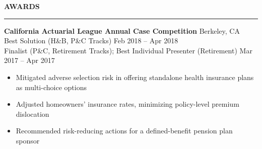\documentclass[11pt,letterpaper]{article}
\newcommand{\sectline}{\vspace{4pt}\hrule height 1.5pt\vspace{4pt}}
\newcommand{\sectspace}{\vspace{9pt}}
\begin{document}
\textbf{AWARDS} \sectline
\textbf{California Actuarial League Annual Case Competition} \hfill Berkeley, CA \\
Best Solution (H\&B, P\&C Tracks) \hfill Feb 2018 -- Apr 2018 \\
Finalist (P\&C, Retirement Tracks); Best Individual Presenter (Retirement) \hfill Mar 2017 -- Apr 2017 
\begin{itemize}
	\item Mitigated adverse selection risk in offering standalone health insurance plans as multi-choice options
	\item Adjusted homeowners' insurance rates, minimizing policy-level premium dislocation 
	\item Recommended risk-reducing actions for a defined-benefit pension plan sponsor
\end{itemize}
\sectspace
\end{document}
